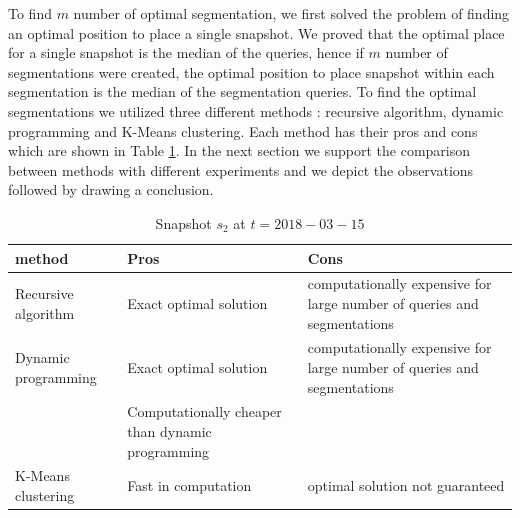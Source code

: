 To find $m$ number of optimal segmentation, we first solved the problem of finding an optimal position to place a single snapshot. We proved that the optimal place for a single snapshot is the median of the queries, hence if $m$ number of segmentations were created, the optimal position to place snapshot within each segmentation is the median of the segmentation queries. To find the optimal segmentations we utilized three different methods : recursive algorithm, dynamic programming and K-Means clustering. Each method has their pros and cons which are shown in Table \ref{table:segmentation_comparison}. In the next section we support the comparison between methods with different experiments and we depict the observations followed by drawing a conclusion. 

\begin{center}
\begin{table}
	\centering
	\small
	\caption{Snapshot $s_2$ at $t = 2018-03-15$}
	\label{table:segmentation_comparison}
	\begin{tabular}{p{4cm}p{4cm}p{4cm}}
		\hline
		method & Pros  & Cons  \\ \hline
		Recursive algorithm & Exact optimal solution & computationally expensive for large number of queries and segmentations   \\ \hline
		Dynamic programming & Exact optimal solution & computationally expensive for large number of queries and segmentations\\ 
		  & Computationally cheaper than dynamic programming &    \\ \hline
		K-Means clustering & Fast in computation & optimal solution not guaranteed \\ \hline
	\end{tabular}
\end{table}
\end{center}
